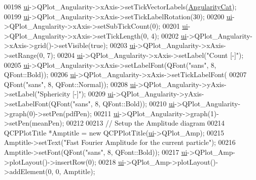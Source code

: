 \begin{DoxyCode}
{00198   \hyperlink{class_v_s_a_main_window_a958a0581d2bf1bfe020c3b5d8f738640}{ui}->QPlot\_Angularity->xAxis->setTickVectorLabels(\hyperlink{class_v_s_a_main_window_ab30d8e8d4b71e2aaad2efa825286e64d}{AngularityCat});
00199   \hyperlink{class_v_s_a_main_window_a958a0581d2bf1bfe020c3b5d8f738640}{ui}->QPlot\_Angularity->xAxis->setTickLabelRotation(30);
00200   \hyperlink{class_v_s_a_main_window_a958a0581d2bf1bfe020c3b5d8f738640}{ui}->QPlot\_Angularity->xAxis->setSubTickCount(0);
00201   \hyperlink{class_v_s_a_main_window_a958a0581d2bf1bfe020c3b5d8f738640}{ui}->QPlot\_Angularity->xAxis->setTickLength(0, 4);
00202   \hyperlink{class_v_s_a_main_window_a958a0581d2bf1bfe020c3b5d8f738640}{ui}->QPlot\_Angularity->xAxis->grid()->setVisible(\textcolor{keyword}{true});
00203   \hyperlink{class_v_s_a_main_window_a958a0581d2bf1bfe020c3b5d8f738640}{ui}->QPlot\_Angularity->xAxis->setRange(0, 7);
00204   \hyperlink{class_v_s_a_main_window_a958a0581d2bf1bfe020c3b5d8f738640}{ui}->QPlot\_Angularity->xAxis->setLabel(\textcolor{stringliteral}{"Count [-]"});
00205   \hyperlink{class_v_s_a_main_window_a958a0581d2bf1bfe020c3b5d8f738640}{ui}->QPlot\_Angularity->xAxis->setLabelFont(QFont(\textcolor{stringliteral}{"sans"}, 8, QFont::Bold));
00206   \hyperlink{class_v_s_a_main_window_a958a0581d2bf1bfe020c3b5d8f738640}{ui}->QPlot\_Angularity->xAxis->setTickLabelFont(
00207       QFont(\textcolor{stringliteral}{"sans"}, 8, QFont::Normal));
00208   \hyperlink{class_v_s_a_main_window_a958a0581d2bf1bfe020c3b5d8f738640}{ui}->QPlot\_Angularity->yAxis->setLabel(\textcolor{stringliteral}{"Sphericity [-]"});
00209   \hyperlink{class_v_s_a_main_window_a958a0581d2bf1bfe020c3b5d8f738640}{ui}->QPlot\_Angularity->yAxis->setLabelFont(QFont(\textcolor{stringliteral}{"sans"}, 8, QFont::Bold));
00210   \hyperlink{class_v_s_a_main_window_a958a0581d2bf1bfe020c3b5d8f738640}{ui}->QPlot\_Angularity->graph(0)->setPen(pdfPen);
00211   \hyperlink{class_v_s_a_main_window_a958a0581d2bf1bfe020c3b5d8f738640}{ui}->QPlot\_Angularity->graph(1)->setPen(meanPen);
00212 
00213   \textcolor{comment}{// Setup the Amplitude diagram}
00214   QCPPlotTitle *Amptitle = \textcolor{keyword}{new} QCPPlotTitle(\hyperlink{class_v_s_a_main_window_a958a0581d2bf1bfe020c3b5d8f738640}{ui}->QPlot\_Amp);
00215   Amptitle->setText(\textcolor{stringliteral}{"Fast Fourier Amplitude for the current particle"});
00216   Amptitle->setFont(QFont(\textcolor{stringliteral}{"sans"}, 8, QFont::Bold));
00217   \hyperlink{class_v_s_a_main_window_a958a0581d2bf1bfe020c3b5d8f738640}{ui}->QPlot\_Amp->plotLayout()->insertRow(0);
00218   \hyperlink{class_v_s_a_main_window_a958a0581d2bf1bfe020c3b5d8f738640}{ui}->QPlot\_Amp->plotLayout()->addElement(0, 0, Amptitle);
}
\end{DoxyCode}
